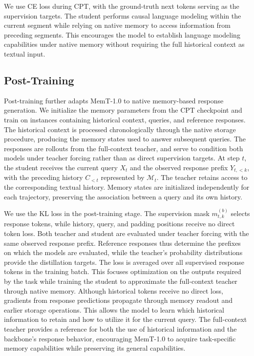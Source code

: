 We use CE loss during CPT, with the ground-truth next tokens serving as the supervision targets. The student performs causal language modeling within the current segment while relying on native memory to access information from preceding segments. This encourages the model to establish language modeling capabilities under native memory without requiring the full historical context as textual input.

\subsection{Post-Training}

Post-training further adapts MemT-1.0 to native memory-based response generation.
We initialize the memory parameters from the CPT checkpoint and train on instances containing historical context, queries, and reference responses.
The historical context is processed chronologically through the native storage procedure, producing the memory states used to answer subsequent queries. The responses are rollouts from the full-context teacher, and serve to condition both models under teacher forcing rather than as direct supervision targets.
At step $t$, the student receives the current query $X_t$ and the observed response prefix $Y_{t,<k}$, with the preceding history $C_{<t}$ represented by $\bm{\mathcal{M}}_t$.
The teacher retains access to the corresponding textual history.
Memory states are initialized independently for each trajectory, preserving the association between a query and its own history.

We use the KL loss in the post-training stage.
The supervision mask $m^{(b)}_{t,k}$ selects response tokens, while history, query, and padding positions receive no direct token loss.
Both teacher and student are evaluated under teacher forcing with the same observed response prefix.
Reference responses thus determine the prefixes on which the models are evaluated, while the teacher's probability distributions provide the distillation targets.
The loss is averaged over all supervised response tokens in the training batch.
This focuses optimization on the outputs required by the task while training the student to approximate the full-context teacher through native memory.
Although historical tokens receive no direct loss, gradients from response predictions propagate through memory readout and earlier storage operations.
This allows the model to learn which historical information to retain and how to utilize it for the current query.
The full-context teacher provides a reference for both the use of historical information and the backbone's response behavior, encouraging MemT-1.0 to acquire task-specific memory capabilities while preserving its general capabilities.

